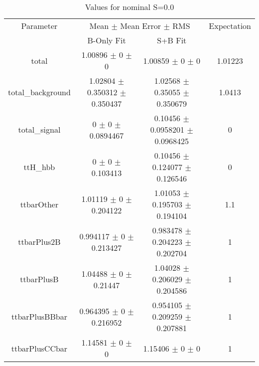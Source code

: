 \begin{table}
\centering
\caption{Values for nominal S=0.0}
\begin{tabular}{cccc}
\toprule
Parameter & \multicolumn{2}{c}{Mean $\pm$ Mean Error $\pm$ RMS} & Expectation\\
 & B-Only Fit & S+B Fit & \\
\midrule
total & \num{1.00896} $\pm$ \num{0} $\pm$ \num{0} & \num{1.00859} $\pm$ \num{0} $\pm$ \num{0} & \num{1.01223}\\
total\_background & \num{1.02804} $\pm$ \num{0.350312} $\pm$ \num{0.350437} & \num{1.02568} $\pm$ \num{0.35055} $\pm$ \num{0.350679} & \num{1.0413}\\
total\_signal & \num{0} $\pm$ \num{0} $\pm$ \num{0.0894467} & \num{0.10456} $\pm$ \num{0.0958201} $\pm$ \num{0.0968425} & \num{0}\\
ttH\_hbb & \num{0} $\pm$ \num{0} $\pm$ \num{0.103413} & \num{0.10456} $\pm$ \num{0.124077} $\pm$ \num{0.126546} & \num{0}\\
ttbarOther & \num{1.01119} $\pm$ \num{0} $\pm$ \num{0.204122} & \num{1.01053} $\pm$ \num{0.195703} $\pm$ \num{0.194104} & \num{1.1}\\
ttbarPlus2B & \num{0.994117} $\pm$ \num{0} $\pm$ \num{0.213427} & \num{0.983478} $\pm$ \num{0.204223} $\pm$ \num{0.202704} & \num{1}\\
ttbarPlusB & \num{1.04488} $\pm$ \num{0} $\pm$ \num{0.21447} & \num{1.04028} $\pm$ \num{0.206029} $\pm$ \num{0.204586} & \num{1}\\
ttbarPlusBBbar & \num{0.964395} $\pm$ \num{0} $\pm$ \num{0.216952} & \num{0.954105} $\pm$ \num{0.209259} $\pm$ \num{0.207881} & \num{1}\\
ttbarPlusCCbar & \num{1.14581} $\pm$ \num{0} $\pm$ \num{0} & \num{1.15406} $\pm$ \num{0} $\pm$ \num{0} & \num{1}\\
\bottomrule
\end{tabular}
\end{table}